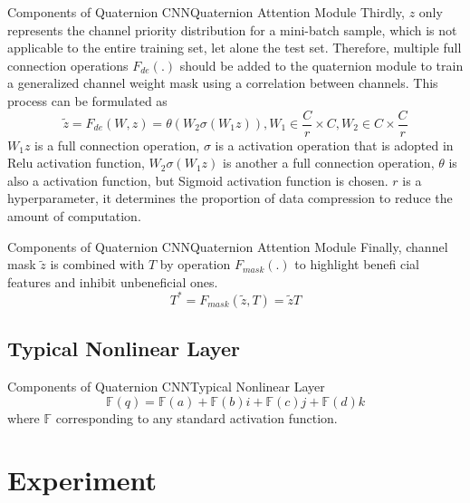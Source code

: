 \documentclass{beamer}
\begin{document}
\begin{frame}{Components of Quaternion CNN}{Quaternion Attention Module}
Thirdly, $z$ only represents the channel priority distribution
for a mini-batch sample, which is not applicable to the entire
training set, let alone the test set. Therefore, multiple full connection operations $F_{de}(.)$ should be added to the quaternion
module to train a generalized channel weight mask using a
correlation between channels. This
process can be formulated as 
\begin{equation}
    \widetilde{z} =F_{de}(W,z)=\theta(W_2\sigma(W_1z)), W_1\in \frac{C}{r}\times C, W_2\in C\times \frac{C}{r}
\end{equation}
$W_1z$ is a full connection operation, $\sigma$ is a activation operation that is adopted in Relu activation function, $W_2\sigma(W_1z)$ is
another a full connection operation, $\theta$ is also a activation function, but Sigmoid activation function is chosen. $r$ is a hyperparameter, it determines the proportion of data compression
to reduce the amount of computation. 
\end{frame}

\begin{frame}{Components of Quaternion CNN}{Quaternion Attention Module}
Finally, channel mask $\widetilde{z}$
    is combined with $T$ by operation $F_{mask}(.)$ to highlight benefi
    cial features and inhibit unbeneficial ones. 
    \begin{equation}
        T^*=F_{mask}(\widetilde{z},T)=\widetilde{z}T
    \end{equation}
\end{frame}


\subsection{Typical Nonlinear Layer}
\begin{frame}{Components of Quaternion CNN}{Typical Nonlinear Layer}
\begin{equation}
    \mathbb{F}  (q) = \mathbb{F} (a) + \mathbb{F} (b) i + \mathbb{F} (c) j + \mathbb{F} (d) k
\end{equation}
where $\mathbb{F}$ corresponding to any standard activation function.
\end{frame}

\section{Experiment}
\end{document}
